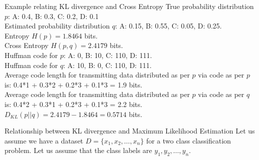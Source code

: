 \documentclass[handout]{beamer}
\begin{document}
    \begin{frame}{Example relating KL divergence and Cross Entropy}
      True probability distribution $p$: A: 0.4, B: 0.3, C: 0.2, D: 0.1 \\
      Estimated probability distribution $q$: A: 0.15, B: 0.55, C: 0.05, D: 0.25. \\

      \pause Entropy $H(p) = 1.8464$ bits. \\
      \pause Cross Entropy $H(p, q) = 2.4179$ bits. \\ 
      \pause Huffman code for $p$: A: 0, B: 10, C: 110, D: 111. \\
    \pause Huffman code for $q$: A: 10, B: 0, C: 110, D: 111. \\  
      \pause Average code length for transmitting data distributed as per $p$ via code as per $p$ is:      
   0.4*1 + 0.3*2 + 0.2*3 + 0.1*3 = 1.9 bits. \\
      \pause Average code length for transmitting data distributed as per $p$ via code as per $q$ is:
    0.4*2 + 0.3*1 + 0.2*3 + 0.1*3 = 2.2 bits. \\
        \pause $D_{KL}(p||q) = 2.4179 - 1.8464 = 0.5714$ bits.
    \end{frame}

    \begin{frame}{Relationship between KL divergence and Maximum Likelihood Estimation}
        Let us assume we have a dataset $D = \{x_1, x_2, \ldots, x_n\}$ for a two class classification problem. 
        Let us assume that the class labels are $y_1, y_2, \ldots, y_n$.
        
    \end{frame}
\end{document}
